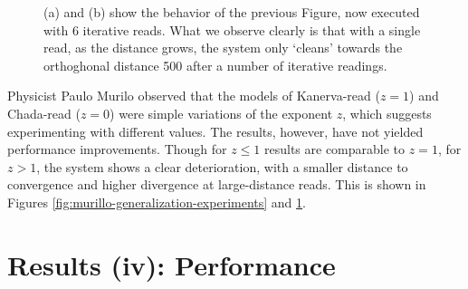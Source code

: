 \begin{figure}[h!]
  \centering


  \caption{(a) and (b) show the behavior of the previous Figure, now executed with 6 iterative reads. What we observe clearly is that with a single read, as the distance grows, the system only `cleans' towards the orthoghonal distance 500 after a number of iterative readings.}
  \label{fig:murillo-generalization-experiments-6reads}
\end{figure}



Physicist Paulo Murilo observed that the models of Kanerva-read ($z=1$) and Chada-read ($z=0$) were simple variations of the exponent $z$, which suggests experimenting with different values. The results, however, have not yielded performance improvements.  Though for $z \leq 1$ results are comparable to $z=1$, for $z>1$, the system shows a clear deterioration, with a smaller distance to convergence and higher divergence at large-distance reads. This is shown in Figures \ref{fig:murillo-generalization-experiments} and \ref{fig:murillo-generalization-experiments-6reads}.


\chapter{Results (iv): Performance}

